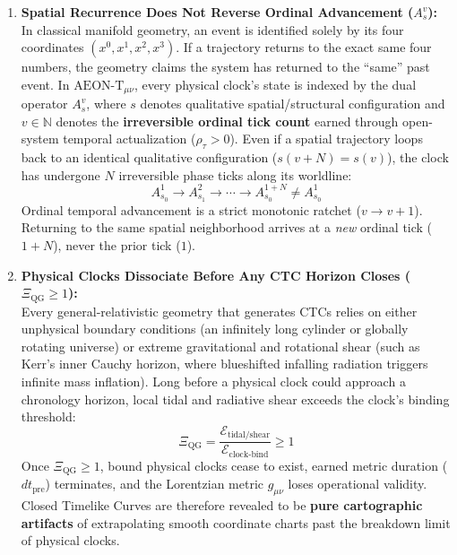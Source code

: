 \documentclass[
]{article}
\providecommand{\tightlist}{%
  \setlength{\itemsep}{0pt}\setlength{\parskip}{0pt}}
\begin{document}
\begin{enumerate}
\def\labelenumi{\arabic{enumi}.}
\tightlist
\item
  \textbf{Spatial Recurrence Does Not Reverse Ordinal Advancement
  (\(A_s^v\)):}\\
  In classical manifold geometry, an event is identified solely by its
  four coordinates \((x^0, x^1, x^2, x^3)\). If a trajectory returns to
  the exact same four numbers, the geometry claims the system has
  returned to the ``same'' past event. In \(\text{AEON-T}_{\mu\nu}\),
  every physical clock's state is indexed by the dual operator
  \(A_s^v\), where \(s\) denotes qualitative spatial/structural
  configuration and \(v \in \mathbb{N}\) denotes the
  \textbf{irreversible ordinal tick count} earned through open-system
  temporal actualization (\(\rho_\tau > 0\)). Even if a spatial
  trajectory loops back to an identical qualitative configuration
  (\(s(v + N) = s(v)\)), the clock has undergone \(N\) irreversible
  phase ticks along its worldline:
  \[A_{s_0}^1 \longrightarrow A_{s_1}^2 \longrightarrow \cdots \longrightarrow A_{s_0}^{1+N} \neq A_{s_0}^1\]
  Ordinal temporal advancement is a strict monotonic ratchet
  (\(v \to v + 1\)). Returning to the same spatial neighborhood arrives
  at a \emph{new} ordinal tick (\(1 + N\)), never the prior tick
  (\(1\)).
\item
  \textbf{Physical Clocks Dissociate Before Any CTC Horizon Closes
  (\(\Xi_{\mathrm{QG}} \ge 1\)):}\\
  Every general-relativistic geometry that generates CTCs relies on
  either unphysical boundary conditions (an infinitely long cylinder or
  globally rotating universe) or extreme gravitational and rotational
  shear (such as Kerr's inner Cauchy horizon, where blueshifted
  infalling radiation triggers infinite mass inflation). Long before a
  physical clock could approach a chronology horizon, local tidal and
  radiative shear exceeds the clock's binding threshold:
  \[\Xi_{\mathrm{QG}} = \frac{\mathcal{E}_{\mathrm{tidal/shear}}}{\mathcal{E}_{\mathrm{clock\text{-}bind}}} \ge 1\]
  Once \(\Xi_{\mathrm{QG}} \ge 1\), bound physical clocks cease to
  exist, earned metric duration (\(dt_{\mathrm{pre}}\)) terminates, and
  the Lorentzian metric \(g_{\mu\nu}\) loses operational validity.
  Closed Timelike Curves are therefore revealed to be \textbf{pure
  cartographic artifacts} of extrapolating smooth coordinate charts past
  the breakdown limit of physical clocks.
\end{enumerate}
\end{document}
